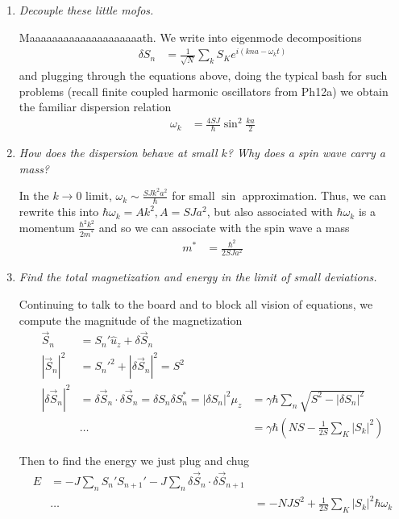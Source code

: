 \documentclass[10pt]{report}
\newcommand{\abs}[1]{\left|#1\right|}
\begin{document}
\begin{enumerate}[1.]
    \item \emph{Decouple these little mofos.}

        Maaaaaaaaaaaaaaaaaaaath. We write into eigenmode decompositions
        \begin{align}
            \delta S_n &= \frac{1}{\sqrt{N}} \sum\limits_{k}^{}S_K e^{i(kna - \omega_kt)}
        \end{align}
        and plugging through the equations above, doing the typical bash for such problems (recall finite coupled harmonic oscillators from Ph12a) we obtain the familiar dispersion relation
        \begin{align}
            \omega_k &= \frac{4SJ}{\hbar}\sin^2 \frac{ka}{2}
        \end{align}

    \item \emph{How does the dispersion behave at small $k$? Why does a spin wave carry a mass?}

        In the $k \to 0$ limit, $\omega_k \sim \frac{SJk^2a^2}{\hbar}$ for small $\sin$ approximation. Thus, we can rewrite this into $\hbar \omega_k = Ak^2, A = SJa^2$, but also associated with $\hbar \omega_k$ is a momentum $\frac{\hbar^2 k^2}{2m^*}$ and so we can associate with the spin wave a mass
        \begin{align}
            m^* &= \frac{\hbar^2}{2SJa^2}
        \end{align}

    \item \emph{Find the total magnetization and energy in the limit of small deviations.}

        Continuing to talk to the board and to block all vision of equations, we compute the magnitude of the magnetization
        \begin{align}
            \vec{S}_n &= S_n' \hat{u}_z + \delta \vec{S}_n\\
            \abs{\vec{S}_n}^2 &= S_n'^2 + \abs{\delta \vec{S}_n}^2 = S^2\\
            \abs{\delta \vec{S}_n}^2 &= \delta \vec{S}_n \cdot \delta \vec{S}_n = \delta S_n \delta S_n^* = \abs{\delta S_n}^2
            \mu_z &= \gamma \hbar \sum\limits_{n}^{}\sqrt{S^2 - \abs{\delta S_n}^2}\\
            &\dots
            &= \gamma \hbar \left( NS - \frac{1}{2S}\sum\limits_{K}^{}\abs{S_k}^2 \right)
        \end{align}

        Then to find the energy we just plug and chug
        \begin{align}
            E &= -J \sum\limits_{n}^{}S_n' S_{n+1}' - J\sum\limits_{n}^{}\delta \vec{S}_n \cdot \delta \vec{S}_{n+1}\\
            &\dots
            &= -NJS^2 + \frac{1}{2S}\sum\limits_{K}^{}\abs{S_k}^2 \hbar \omega_k
        \end{align}
\end{enumerate}
\end{document}

